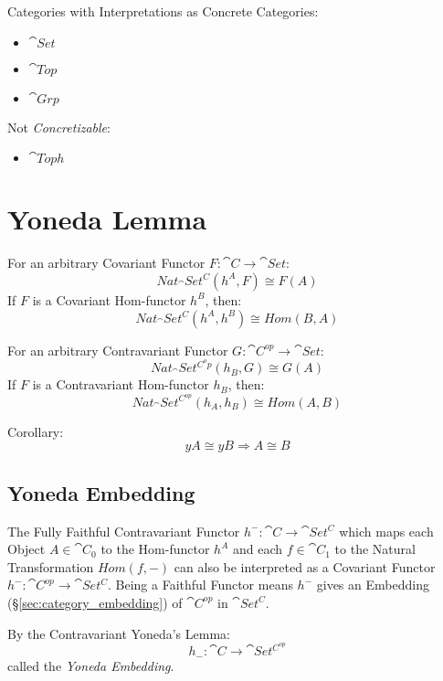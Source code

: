 Categories with Interpretations as Concrete Categories:
\begin{itemize}
  \item $\cat{Set}$
  \item $\cat{Top}$
  \item $\cat{Grp}$
\end{itemize}

Not \emph{Concretizable}:
\begin{itemize}
  \item $\cat{Toph}$
\end{itemize}



\section{Yoneda Lemma}\label{sec:yoneda_lemma}

For an arbitrary Covariant Functor $F : \cat{C} \rightarrow
\cat{Set}$:
\[
  Nat_\cat{Set^C}(h^A,F) \cong F(A)
\]
If $F$ is a Covariant Hom-functor $h^B$, then:
\[
  Nat_\cat{Set^C}(h^A,h^B) \cong Hom(B,A)
\]

For an arbitrary Contravariant Functor $G : \cat{C}^{op} \rightarrow
\cat{Set}$:
\[
  Nat_\cat{Set^{C^op}}(h_B,G) \cong G(A)
\]
If $F$ is a Contravariant Hom-functor $h_B$, then:
\[
  Nat_\cat{Set^{C^{op}}}(h_A,h_B) \cong Hom(A,B)
\]

Corollary:
\[
  yA \cong yB \Rightarrow A \cong B
\]



\subsection{Yoneda Embedding}\label{sec:yoneda_embedding}

The Fully Faithful Contravariant Functor $h^- : \cat{C} \rightarrow
\cat{Set^C}$ which maps each Object $A \in \cat{C}_0$ to the
Hom-functor $h^A$ and each $f \in \cat{C}_1$ to the Natural
Transformation $Hom(f,-)$ can also be interpreted as a Covariant
Functor $h^- : \cat{C^{op}} \rightarrow \cat{Set^C}$. Being a
Faithful Functor means $h^-$ gives an Embedding
(\S\ref{sec:category_embedding}) of $\cat{C^{op}}$ in
$\cat{Set^C}$.

By the Contravariant Yoneda's Lemma:
\[
  h_-: \cat{C} \rightarrow \cat{Set^{C^{op}}}
\]
called the \emph{Yoneda Embedding}.

